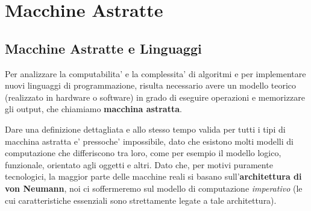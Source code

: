 \chapter{Macchine Astratte}
\section{Macchine Astratte e Linguaggi}
Per analizzare la computabilita' e la complessita' di algoritmi e per implementare nuovi linguaggi di programmazione, risulta necessario avere un modello teorico (realizzato in hardware o software) in grado di eseguire operazioni e memorizzare gli output, che chiamiamo \textbf{macchina astratta}. 

Dare una definizione dettagliata e allo stesso tempo valida per tutti i tipi di macchina astratta e' pressoche' impossibile, dato che esistono molti modelli di computazione che differiscono tra loro, come per esempio il modello logico, funzionale, orientato agli oggetti e altri. Dato che, per motivi puramente tecnologici, la maggior parte delle macchine reali si basano sull'\textbf{architettura di von Neumann}, noi ci soffermeremo sul modello di computazione \textit{imperativo} (le cui caratteristiche essenziali sono strettamente legate a tale architettura).
